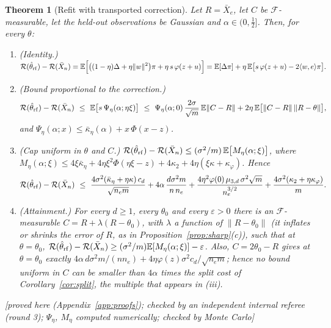 \documentclass[10pt,a4paper]{article}
\theoremstyle{plain}
\newtheorem{theorem}{Theorem}[section]
\theoremstyle{definition}
\theoremstyle{remark}
\newcommand{\E}{\mathbb{E}}
\newcommand{\risk}{\mathcal{R}}
\newcommand{\norm}[1]{\lVert #1\rVert}
\newcommand{\ip}[1]{\langle #1\rangle}
\newcommand{\status}[1]{\textsf{\small [#1]}}
\begin{document}
\begin{theorem}[Refit with transported correction]\label{thm:refit}
Let $R=\bar X_e$, let $C$ be $\mathcal F$-measurable, let the held-out observations be Gaussian and $\alpha\in(0,\tfrac12]$. Then, for every $\theta$:
\begin{enumerate}[leftmargin=2em,label=(\roman*)]
\item \textup{(Identity.)}
$\displaystyle \risk(\hat\theta_{\rm rf})-\risk(\bar X_n)=\E\Big[\big((1-\eta)\Delta+\eta\norm w^2\big)\pi+\eta\,s\,\varphi(z+u)\Big]
=\E[\Delta\pi]+\eta\,\E\big[s\,\varphi(z+u)-2\ip{w,e}\pi\big].$
\item \textup{(Bound proportional to the correction.)}
\[
\risk(\hat\theta_{\rm rf})-\risk(\bar X_n)\ \le\ \E\big[s\,\Psi_\eta(\alpha;\eta\xi)\big]
\ \le\ \Psi_\eta(\alpha;0)\,\frac{2\sigma}{\sqrt m}\,\E\norm{C-R}+2\eta\,\E\big[\norm{C-R}\,\norm{R-\theta}\big],
\]
and $\Psi_\eta(\alpha;x)\le\bar\kappa_\eta(\alpha)+x\,\Phi(x-z)$.
\item \textup{(Cap uniform in $\theta$ and $C$.)} $\risk(\hat\theta_{\rm rf})-\risk(\bar X_n)\le(\sigma^2/m)\,\E\big[M_\eta(\alpha;\xi)\big]$, where $M_\eta(\alpha;\xi)\le4\xi\bar\kappa_\eta+4\eta\xi^2\Phi(\eta\xi-z)+4\kappa_2+4\eta(\xi\kappa+\kappa_\varphi)$. Hence
\[
\risk(\hat\theta_{\rm rf})-\risk(\bar X_n)\ \le\ \frac{4\sigma^2(\bar\kappa_\eta+\eta\kappa)\,c_d}{\sqrt{n_e m}}
+4\alpha\,\frac{d\sigma^2 m}{n\,n_e}
+\frac{4\eta^2\varphi(0)\,\mu_{3,d}\,\sigma^2\sqrt m}{n_e^{3/2}}
+\frac{4\sigma^2(\kappa_2+\eta\kappa_\varphi)}{m}.
\]
\item \textup{(Attainment.)} For every $d\ge1$, every $\theta_0$ and every $\varepsilon>0$ there is an $\mathcal F$-measurable $C=R+\lambda(R-\theta_0)$, with $\lambda$ a function of $\norm{R-\theta_0}$ (it inflates or shrinks the error of $R$, as in Proposition~\ref{prop:sharp}(c)), such that at $\theta=\theta_0$, $\risk(\hat\theta_{\rm rf})-\risk(\bar X_n)\ge(\sigma^2/m)\E[M_\eta(\alpha;\xi)]-\varepsilon$. Also, $C=2\theta_0-R$ gives at $\theta=\theta_0$ exactly $4\alpha\,d\sigma^2m/(nn_e)+4\eta\varphi(z)\sigma^2c_d/\sqrt{n_em}$; hence no bound uniform in $C$ can be smaller than $4\alpha$ times the split cost of Corollary~\ref{cor:split}, the multiple that appears in (iii).
\end{enumerate}
\status{proved here (Appendix~\ref{app:proofs}); checked by an independent internal referee (round 3); $\Psi_\eta$, $M_\eta$ computed numerically; checked by Monte Carlo}
\end{theorem}
\end{document}

